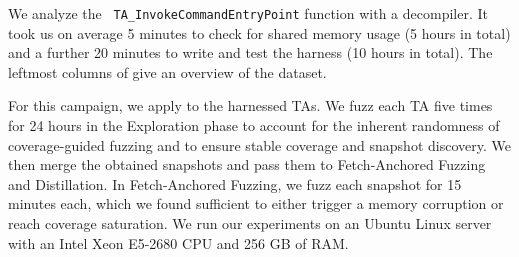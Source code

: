 \documentclass[conference]{IEEEtran} %
\newcommand{\sysname}{ScHMuzz\xspace}
\newcommand{\stageone}{Exploration\xspace}
\newcommand{\stagetwo}{Fetch-Anchored Fuzzing\xspace} %
\newcommand{\stagethree}{Distillation\xspace}
\newcommand{\numTAsharnessed}{30\xspace}
\newcommand{\numruns}{five\xspace}
\providecommand{\DIFdeltex}[1]{{\protect\color{red} \scriptsize #1}} %
\providecommand{\DIFdelbegin}{} %
\providecommand{\DIFdelend}{} %
\providecommand{\DIFdel}[1]{\texorpdfstring{\DIFdeltex{#1}}{}} %
\begin{document}

\DIFdelend 

We \DIFdelbegin \DIFdel{analyze the }\texttt{\DIFdel{TA\_InvokeCommandEntryPoint}} %
\DIFdel{function with a decompiler. It took us on average 
5 minutes to check for shared memory usage (5 hours in total) and a further 20 minutes to write and test the harness (10 hours in total). The leftmost columns of }%
\DIFdel{give an overview of the dataset.
}%

\DIFdel{For this campaign, we apply }%
\DIFdel{to the }%
\DIFdel{harnessed TAs. We }\DIFdelend fuzz each TA \numruns times for 24 hours in the \stageone 
phase to account for the inherent randomness of coverage-guided 
fuzzing and to ensure stable coverage and snapshot discovery. 
We then merge the obtained snapshots and pass them to 
\stagetwo and \stagethree. In \stagetwo, we fuzz each snapshot for 15 minutes each, 
which we found sufficient to either trigger a memory corruption or reach coverage saturation.
We run our experiments on an Ubuntu Linux server with an Intel Xeon E5-2680 CPU and 256 GB of RAM.
\end{document}
